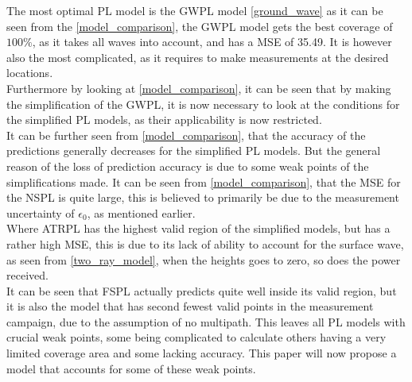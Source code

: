 The most optimal PL model is the GWPL model \eqref{ground_wave} as it can be seen from the  \autoref{model_comparison}, the GWPL model gets the best coverage of $100\%$, as it takes all waves into account, and has a MSE of 35.49. It is however also the most complicated, as it requires to make measurements at the desired locations.\\
Furthermore by looking at \autoref{model_comparison}, it can be seen that by making the simplification of the GWPL, it is now necessary to look at the conditions for the simplified PL models, as their applicability is now restricted.\\
It can be further seen from \autoref{model_comparison}, that the accuracy of the predictions generally decreases for the simplified PL models. But the general reason of the loss of prediction accuracy is due to some weak points of the simplifications made.
It can be seen from \autoref{model_comparison}, that the MSE for the NSPL is quite large, this is believed to primarily be due to the measurement uncertainty of $\epsilon_{0}$, as mentioned earlier. \\ 
Where ATRPL has the highest valid region of the simplified models, but has a rather high MSE, this is due to its lack of ability to account for the surface wave, as seen from \eqref{two_ray_model}, when the heights goes to zero, so does the power received. \\
It can be seen that FSPL actually predicts quite well inside its valid region, but it is also the model that has second fewest valid points in the measurement campaign, due to the assumption of no multipath. 
This leaves all PL models with crucial weak points, some being complicated to calculate others having a very limited coverage area and some lacking accuracy. This paper will now propose a model that accounts for some of these weak points. 





